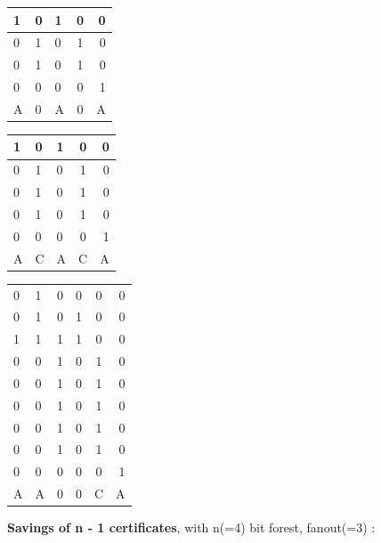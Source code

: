 	\begin{multicols}{3}

		\begin{tabular}{ l |l l c r }
		  
		  1 & 0 & 1 & 0 & 0 \\
		  \hline
		  0 & 1 & 0 & 1 & 0 \\
		  0 & 1 & 0 & 1 & 0 \\
		  0 & 0 & 0 & 0 & 1 \\
		  \hline	
		  A & 0 & A & 0 & A \\
		
		\end{tabular}
		\columnbreak{|}
		\begin{tabular}{ l |l l c r }
		  
		  1 & 0 & 1 & 0 & 0 \\
		  \hline
		  0 & 1 & 0 & 1 & 0 \\
		  0 & 1 & 0 & 1 & 0 \\
		  0 & 1 & 0 & 1 & 0 \\
		  0 & 0 & 0 & 0 & 1 \\
		  \hline	
		  A & C & A & C & A \\
		
		\end{tabular}
		\columnbreak{|}
		\begin{tabular}{ l l |l l c r }
		  
		  0 & 1 & 0 & 0 & 0 & 0 \\
		  0 & 1 & 0 & 1 & 0 & 0 \\
		  1 & 1 & 1 & 1 & 0 & 0 \\
		  \hline
		  0 & 0 & 1 & 0 & 1 & 0 \\
		  0 & 0 & 1 & 0 & 1 & 0 \\
		  0 & 0 & 1 & 0 & 1 & 0 \\
		  0 & 0 & 1 & 0 & 1 & 0 \\
		  0 & 0 & 1 & 0 & 1 & 0 \\
		  0 & 0 & 0 & 0 & 0 & 1 \\
		  \hline	
		  A & A & 0 & 0 & C & A \\
		
		\end{tabular}

	\end{multicols}

	\newpage

	 \textbf{Savings of n - 1 certificates}, with n(=4) bit forest, fanout(=3) :

